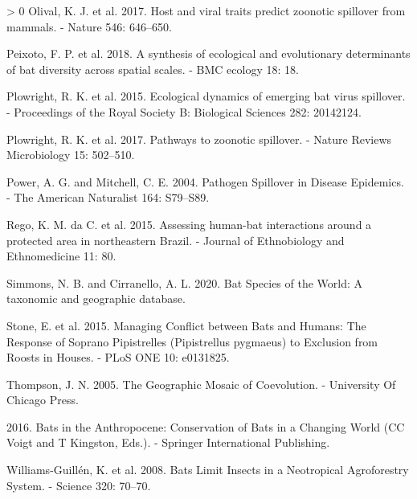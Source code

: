 \documentclass[10pt,oneside]{article}
\newlength{\cslhangindent}
\newenvironment{CSLReferences}[3] %
 {%
  \setlength{\parindent}{0pt}
  \ifodd #1 \everypar{\setlength{\hangindent}{\cslhangindent}}\ignorespaces\fi
  \ifnum #2 > 0
  \setlength{\parskip}{#2\baselineskip}
  \fi
 }%
 {}
\begin{document}
\begin{CSLReferences}{1}{0}
\leavevmode\hypertarget{ref-Olival2017HosVir}{}%
Olival, K. J. et al. 2017. Host and viral traits predict zoonotic
spillover from mammals. - Nature 546: 646--650.

\leavevmode\hypertarget{ref-Peixoto2018SynEco}{}%
Peixoto, F. P. et al. 2018. A synthesis of ecological and evolutionary
determinants of bat diversity across spatial scales. - BMC ecology 18:
18.

\leavevmode\hypertarget{ref-Plowright2015EcoDyn}{}%
Plowright, R. K. et al. 2015. Ecological dynamics of emerging bat virus
spillover. - Proceedings of the Royal Society B: Biological Sciences
282: 20142124.

\leavevmode\hypertarget{ref-Plowright2017PatZoo}{}%
Plowright, R. K. et al. 2017. Pathways to zoonotic spillover. - Nature
Reviews Microbiology 15: 502--510.

\leavevmode\hypertarget{ref-Power2004PatSpi}{}%
Power, A. G. and Mitchell, C. E. 2004. Pathogen Spillover in Disease
Epidemics. - The American Naturalist 164: S79--S89.

\leavevmode\hypertarget{ref-Rego2015AssHum}{}%
Rego, K. M. da C. et al. 2015. Assessing human-bat interactions around a
protected area in northeastern Brazil. - Journal of Ethnobiology and
Ethnomedicine 11: 80.

\leavevmode\hypertarget{ref-Simmons2020BatSpe}{}%
Simmons, N. B. and Cirranello, A. L. 2020. Bat Species of the World: A
taxonomic and geographic database.

\leavevmode\hypertarget{ref-Stone2015ManCon}{}%
Stone, E. et al. 2015. Managing Conflict between Bats and Humans: The
Response of Soprano Pipistrelles (Pipistrellus pygmaeus) to Exclusion
from Roosts in Houses. - PLoS ONE 10: e0131825.

\leavevmode\hypertarget{ref-Thompson2005GeoMos}{}%
Thompson, J. N. 2005. The Geographic Mosaic of Coevolution. - University
Of Chicago Press.

\leavevmode\hypertarget{ref-Voigt2016BatAnt}{}%
2016. Bats in the Anthropocene: Conservation of Bats in a Changing World
(CC Voigt and T Kingston, Eds.). - Springer International Publishing.

\leavevmode\hypertarget{ref-Williams-Guillen2008BatLim}{}%
Williams-Guillén, K. et al. 2008. Bats Limit Insects in a Neotropical
Agroforestry System. - Science 320: 70--70.

\end{CSLReferences}
\end{document}
